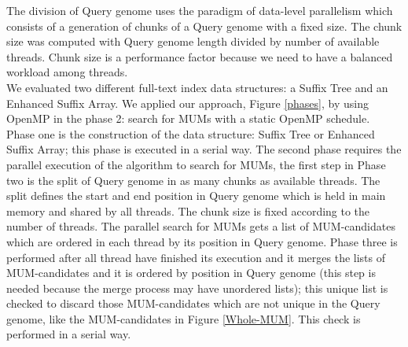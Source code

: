 \documentclass[runningheads,a4paper]{llncs}
\begin{document}
The division of Query genome  uses the paradigm of data-level parallelism which consists of a generation of chunks of a Query genome with a fixed size. The chunk size was computed with Query genome length divided by number of available threads. Chunk size is a performance factor because we need to have a balanced workload among threads.\\
We evaluated two different full-text index data structures: a Suffix Tree and an Enhanced Suffix Array. We applied our approach, Figure \ref{phases}, by using OpenMP in the phase 2: search for MUMs with a static OpenMP schedule.\\
Phase one is the construction of the data structure: Suffix Tree or Enhanced Suffix Array; this phase is executed in a serial way. The second phase requires the parallel execution of the algorithm to search for MUMs, the first step in Phase two is the split of Query genome in as many chunks as available threads. The split defines the start and end position in Query genome which is held in main memory and shared by all threads. The chunk size is fixed according to the number of threads. The parallel search for MUMs gets a list of MUM-candidates which are ordered in each thread by its position in Query genome. Phase three is performed after all thread have finished its execution and it merges the lists of MUM-candidates and it is ordered by position in Query genome (this step is needed because the merge process may have unordered lists); this unique list is checked to discard those MUM-candidates which are not unique in the Query genome, like the MUM-candidates in Figure \ref{Whole-MUM}. This check is performed in a serial way.
\end{document}
